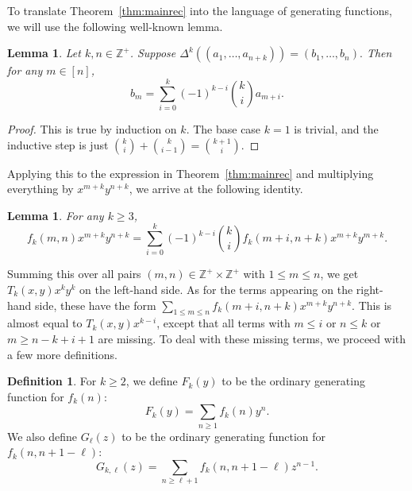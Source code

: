 \documentclass{amsart}
\newtheorem{lemma}[theorem]{Lemma}
\theoremstyle{definition}
\newtheorem{definition}[theorem]{Definition}
\begin{document}
To translate Theorem~\ref{thm:mainrec} into the language of generating functions, we will use the following well-known lemma.

\begin{lemma}
Let $k,n\in \mathbb{Z}^+$. Suppose
$\Delta^k\left(\left(a_1,\ldots, a_{n+k}\right)\right)=\left(b_1, \ldots, b_n\right).$
Then for any $m\in [n]$, \[b_m=\sum_{i=0}^k (-1)^{k-i}\binom{k}{i}a_{m+i}.\]
\end{lemma}

\begin{proof}
This is true by induction on $k$. The base case $k=1$ is trivial, and the inductive step is just $\binom{k}{i}+\binom{k}{i-1}=\binom{k+1}{i}$.
\end{proof}

Applying this to the expression in Theorem~\ref{thm:mainrec} and multiplying everything by $x^{m+k} y^{n+k}$, we arrive at the following identity.

\begin{lemma}\label{lem:gen}
For any $k\geq 3$,
\[f_k(m,n)x^{m+k} y^{n+k}=\sum_{i=0}^k (-1)^{k-i}\binom{k}{i}f_k(m+i,n+k)x^{m+k}y^{m+k}.\]
\end{lemma}

Summing this over all pairs $(m,n)\in \mathbb{Z}^+\times\mathbb{Z}^+$ with $1\leq m\leq n$, we get $T_k(x,y)x^k y^k$ on the left-hand side. As for the terms appearing on the right-hand side, these have the form $\sum_{1\leq m\leq n} f_k(m+i,n+k)x^{m+k}y^{n+k}$. This is almost equal to $T_k(x,y)x^{k-i}$, except that all terms with $m\leq i$ or $n\leq k$ or $m\geq n-k+i+1$ are missing. To deal with these missing terms, we proceed with a few more definitions. 


\begin{definition}
For $k\geq 2$, we define $F_k(y)$ to be the ordinary generating function for $f_k(n)$:
\[F_k(y)=\sum_{n\geq 1}f_k(n)y^n.\]
We also define $G_\ell(z)$ to be the ordinary generating function for $f_k(n,n+1-\ell)$:
\[G_{k,\ell}(z)=\sum_{n\geq \ell+1}f_k(n,n+1-\ell)z^{n-1}.\]
\end{definition}
\end{document}
